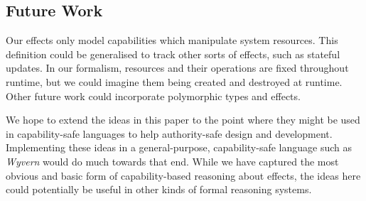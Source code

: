 \vspace{-0.6cm}
\subsection{Future Work}
\vspace{-0.2cm}

Our effects only model capabilities which manipulate system resources. This
definition could be generalised to track other sorts of effects, such as stateful
updates. In our formalism, resources and their operations are fixed throughout
runtime, but we could imagine them being created and destroyed at runtime. Other
future work could incorporate polymorphic types and effects.

We hope to extend the ideas in this paper to the point where they might be used in
capability-safe languages to help authority-safe design and development.
Implementing these ideas in a general-purpose, capability-safe language such as \textit{Wyvern}
would do much towards that end.
While we have captured the most obvious and basic form of capability-based reasoning about effects, the ideas here could potentially be useful in other kinds of formal reasoning systems.


